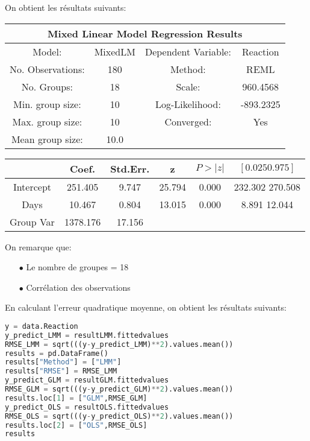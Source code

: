 On obtient les résultats suivants:

\begin{center}
\begin{tabular}{ c c c c }
\multicolumn{4}{c}{Mixed Linear Model Regression Results} \\
\hline
\hline
Model: & MixedLM & Dependent Variable: & Reaction \\
No. Observations: & 180 & Method: & REML\\     
No. Groups: & 18 & Scale: & 960.4568\\
Min. group size: & 10 & Log-Likelihood: & -893.2325\\
Max. group size: & 10 & Converged: & Yes\\
Mean group size: & 10.0 & &
\end{tabular}
\begin{tabular}{ c c c c c c }
\hline
 & Coef. & Std.Err. & z & $P>|z|$  & $[0.025  0.975]$\\
\hline
Intercept & 251.405 & 9.747 & 25.794 & 0.000 & 232.302 270.508\\
Days & 10.467 & 0.804 & 13.015 & 0.000 & 8.891  12.044\\
Group Var & 1378.176 & 17.156 & & & \\
\hline
\hline
\end{tabular}
\end{center}

On remarque que:

\begin{itemize}
    \item[$\bullet$] Le nombre de groupes = 18
    \item[$\bullet$] Corrélation des observations
\end{itemize}

En calculant l'erreur quadratique moyenne, on obtient les résultats suivants:

\begin{lstlisting}[language=Python]
y = data.Reaction
y_predict_LMM = resultLMM.fittedvalues
RMSE_LMM = sqrt(((y-y_predict_LMM)**2).values.mean())
results = pd.DataFrame()
results["Method"] = ["LMM"]
results["RMSE"] = RMSE_LMM
y_predict_GLM = resultGLM.fittedvalues
RMSE_GLM = sqrt(((y-y_predict_GLM)**2).values.mean())
results.loc[1] = ["GLM",RMSE_GLM]
y_predict_OLS = resultOLS.fittedvalues
RMSE_OLS = sqrt(((y-y_predict_OLS)**2).values.mean())
results.loc[2] = ["OLS",RMSE_OLS]
results
\end{lstlisting}

